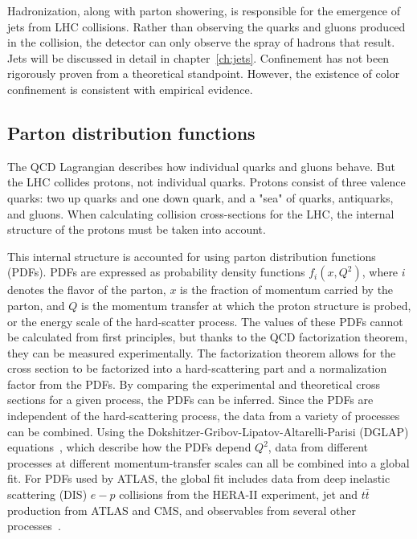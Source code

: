 Hadronization, along with parton showering, is responsible for the emergence of jets from LHC collisions.
Rather than observing the quarks and gluons produced in the collision,
the detector can only observe the spray of hadrons that result.
Jets will be discussed in detail in chapter~\ref{ch:jets}.
Confinement has not been rigorously proven from a theoretical standpoint.
However, the existence of color confinement is consistent with empirical evidence.

\subsection{Parton distribution functions}\label{subsec:qcd_pdfs}

The QCD Lagrangian describes how individual quarks and gluons behave.
But the LHC collides protons, not individual quarks.
Protons consist of three valence quarks: two up quarks and one down quark, and a "sea" of quarks, antiquarks, and gluons.
When calculating collision cross-sections for the LHC, the internal structure of the protons must be taken into account.

This internal structure is accounted for using parton distribution functions (PDFs).
PDFs are expressed as probability density functions $f_i(x, Q^2)$, where $i$ denotes the flavor of the parton, $x$ is the fraction of momentum carried by the parton, and $Q$ is the momentum transfer at which the proton structure is probed, or the energy scale of the hard-scatter process.
The values of these PDFs cannot be calculated from first principles, but thanks to the QCD factorization theorem, they can be measured experimentally.
The factorization theorem allows for the cross section to be factorized into a hard-scattering part and a normalization factor from the PDFs.
By comparing the experimental and theoretical cross sections for a given process, the PDFs can be inferred.
Since the PDFs are independent of the hard-scattering process, the data from a variety of processes can be combined.
Using the  Dokshitzer-Gribov-Lipatov-Altarelli-Parisi (DGLAP) equations~\cite{sm-dglap}, which describe how the PDFs depend $Q^2$, data from different processes at different momentum-transfer scales can all be combined into a global fit.
For PDFs used by ATLAS, the global fit includes data from deep inelastic scattering (DIS) $e-p$ collisions from the HERA-II experiment, jet and $t\bar{t}$ production from ATLAS and CMS, and observables from several other processes~\cite{sm-pdf-atlas-run2}.

